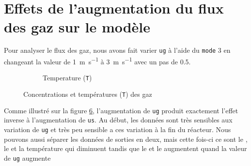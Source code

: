 \documentclass[11pt]{report}
\begin{document}
    \section{Effets de l'augmentation du flux des gaz sur le modèle}
      Pour analyser le flux des gaz, nous avons fait varier \verb|ug| à l'aide du \verb|mode| 3
      en changeant la valeur de \SI{1}{\meter\per\second} à \SI{3}{\meter\per\second} avec un pas de 0.5.
      \begin{figure}[ht]
        \centering
        \begin{subfigure}[t]{0.325\textwidth}
          \centering
          
          \caption{}
          \label{graph:con:3:CH4}
        \end{subfigure}
        \hfill
        \begin{subfigure}[t]{0.325\textwidth}
          \centering
          
          \caption{}
          \label{graph:con:3:H2}
        \end{subfigure}
        \hfill
        \begin{subfigure}[t]{0.325\textwidth}
          \centering
          
          \caption{}
          \label{graph:con:3:CO}
        \end{subfigure}
        \hfill
        \begin{subfigure}[t]{0.325\textwidth}
          \centering
          
          \caption{}
          \label{graph:con:3:CO2}
        \end{subfigure}
        \begin{subfigure}[t]{0.325\textwidth}
          \centering
          
          \caption{Temperature (\texttt{T})}
          \label{graph:con:3:T}
        \end{subfigure}
        \caption{Concentrations et températures (\texttt{T}) des gaz}
        \label{graph:con:3}
      \end{figure}
      \par 
      Comme illustré sur la figure \ref{graph:con:3}, l'augmentation de \verb|ug| produit exactement l'effet 
      inverse à l'augmentation de \verb|us|. Au début, les données sont très sensibles aux variation de \verb|ug| 
      et très peu sensible a ces variation à la fin du réacteur. Nous pouvons aussi séparer les données 
      de sorties en deux, mais cette fois-ci ce sont le , le  et la température qui diminuent 
      tandis que le  et le  augmentent quand la valeur de \verb|ug| augmente
    
\end{document}
